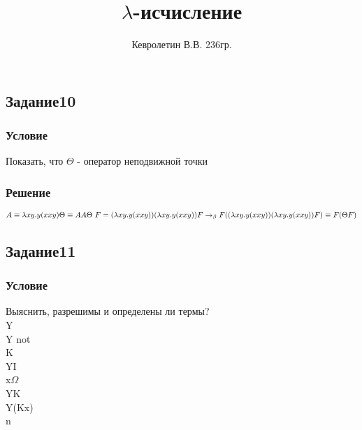 \documentclass[10pt,a4paper]{article}
\author{Кевролетин В.В. 236гр.}
\title{$\lambda$-исчисление}
\begin{document}
\maketitle

\subsection*{Задание10}
\subsubsection*{Условие}
Показать, что $\Theta{}$ - оператор неподвижной точки 
\subsubsection*{Решение}

$A \equiv \lambda xy.y(xxy) \\
\Theta \equiv AA \\
\Theta \ F = (\lambda xy.y(xxy))(\lambda xy.y(xxy))F
\rightarrow_\beta 
F((\lambda xy.y(xxy))(\lambda xy.y(xxy))F) \equiv F (\Theta F) $

\subsection*{Задание11}
\subsubsection*{Условие}
Выяснить, разрешимы и определены ли термы? \\
Y\\
Y not\\
K\\
YI\\
x$\Omega$\\
YK\\
Y(Kx)\\
n\\
\end{document}
